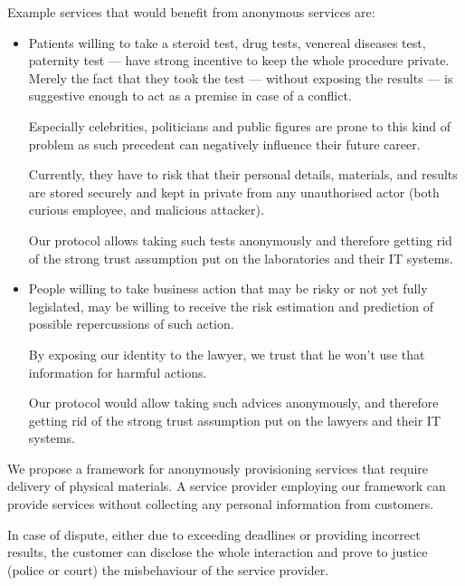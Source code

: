 \documentclass{ieeeaccess}
\begin{document}
Example services that would benefit from anonymous services are:
\begin{itemize}
    \item Patients willing to take a steroid test, drug tests, venereal diseases test, paternity test — have strong incentive to keep the whole procedure private. Merely the fact that they took the test — without exposing the results — is suggestive enough to act as a premise in case of a conflict.

Especially celebrities, politicians and public figures are prone to this kind of problem as such precedent can negatively influence their future career.

Currently, they have to risk that their personal details, materials, and results are stored securely and kept in private from any unauthorised actor (both curious employee, and malicious attacker).

Our protocol allows taking such tests anonymously and therefore getting
rid of the strong trust assumption put on the laboratories and their IT
systems.
\item People willing to take business action that may be risky or not yet fully legislated, may be willing to receive the risk estimation and prediction of possible repercussions of such action.

By exposing our identity to the lawyer, we trust that he won't use that
information for harmful actions.

Our protocol would allow taking such advices anonymously, and therefore
getting rid of the strong trust assumption put on the lawyers and their IT systems.
\end{itemize}

We propose a framework for anonymously provisioning services that require delivery of physical materials. A service provider employing our framework can provide services without collecting any personal information from customers.

In case of dispute, either due to exceeding deadlines or providing
incorrect results, the customer can disclose the whole interaction and
prove to justice (police or court) the misbehaviour of the service
provider.
\end{document}
